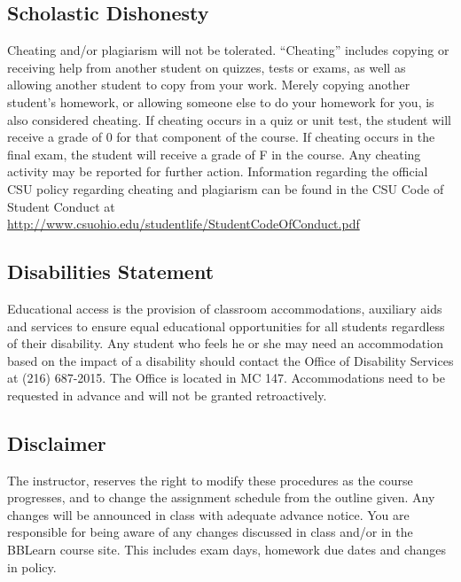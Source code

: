 \documentclass[11pt]{article}
\begin{document}
\subsection{Scholastic Dishonesty}
Cheating and/or plagiarism will not be tolerated. ``Cheating'' includes copying or receiving help from
another student on quizzes, tests or exams, as well as allowing another student to copy from your work. 
Merely copying another student's homework, or allowing someone else to do your homework for you, is also 
considered cheating. If cheating occurs in a quiz or unit test, the student will receive a grade of 0 for 
that component of the course. If cheating occurs in the final exam, the student will receive a grade of F in 
the course. Any cheating activity may be reported for further action.  Information regarding the official
CSU policy regarding cheating and plagiarism can be found in the  CSU Code of Student Conduct at 
\href{http://www.csuohio.edu/studentlife/StudentCodeOfConduct.pdf}{http://www.csuohio.edu/studentlife/StudentCodeOfConduct.pdf}

\subsection{Disabilities Statement} 
Educational access is the provision of classroom accommodations, auxiliary aids and services to ensure 
equal educational opportunities for all students regardless of their disability. Any student who feels 
he or she may need an accommodation based on the impact of a disability should contact the Office of 
Disability Services at (216) 687-2015. The Office is located in MC 147. Accommodations need to be 
requested in advance and will not be granted retroactively.

\subsection{Disclaimer}
The instructor, reserves the right to modify these procedures 
as the course progresses, and to change the assignment schedule from the outline given. Any changes will 
be announced in class with adequate advance notice. You are responsible for being aware of any changes 
discussed in class and/or in the BBLearn course site. This includes exam days, homework due dates and changes 
in policy.


\end{document}
